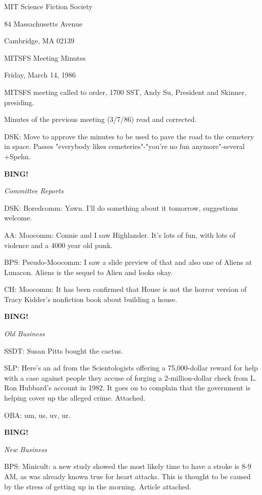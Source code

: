 \documentclass[12pt]{article}
\newcommand{\bing}{{\bf BING!} }
\newcommand{\goto}[1]{\bing \vskip 12pt \centerline{{\em{#1}}}}
\begin{document}
\begin{center}

MIT Science Fiction Society 

84 Massachusetts Avenue

Cambridge, MA 02139

\vspace{12pt}

MITSFS Meeting Minutes 

Friday, March 14, 1986

\end{center}
 
\vspace{18pt}

\setlength{\parskip}{6pt}

\noindent
MITSFS meeting called to order, 1700 SST,
Andy Su, President and Skinner, presiding.

Minutes of the previous meeting (3/7/86) read and corrected.

DSK: Move to approve the minutes to be used to pave the road to the cemetery in space. Passes "everybody likes cemeteries"-"you're no fun anymore"-several +Spehn.

\goto{Committee Reports}

DSK: Boredcomm: Yawn. I'll do something about it tomorrow, suggestions welcome.

AA: Moocomm: Connie and I saw Highlander. It's lots of fun, with lots of violence and a 4000 year old punk.

BPS: Pseudo-Moocomm: I saw a slide preview of that and also one of Aliens at Lunacon. Aliens is the sequel to Alien and looks okay.

CH: Moocomm: It has been confirmed that House is not the horror version of Tracy Kidder's nonfiction book about building a house.

\goto{Old Business}

SSDT: Susan Pitts bought the cactus.

SLP: Here's an ad from the Scientologists offering a 75,000-dollar reward for help with a case against people they accuse of forging a 2-million-dollar check from L. Ron Hubbard's account in 1982. It goes on to complain that the government is helping cover up the alleged crime. Attached.

OBA: um, us, uv, ur.

\goto{New Business}

BPS: Minicult: a new study showed the most likely time to have a stroke is 8-9 AM, as was already known true for heart attacks. This is thought to be caused by the stress of getting up in the morning. Article attached.
\end{document}
